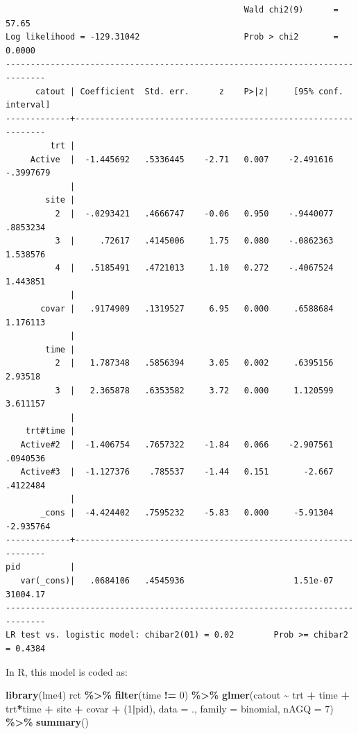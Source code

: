 \documentclass[
]{book}
\newenvironment{Shaded}{\begin{snugshade}}{\end{snugshade}}
\newcommand{\AttributeTok}[1]{\textcolor[rgb]{0.13,0.29,0.53}{#1}}
\newcommand{\DecValTok}[1]{\textcolor[rgb]{0.00,0.00,0.81}{#1}}
\newcommand{\FunctionTok}[1]{\textcolor[rgb]{0.13,0.29,0.53}{\textbf{#1}}}
\newcommand{\NormalTok}[1]{#1}
\newcommand{\SpecialCharTok}[1]{\textcolor[rgb]{0.81,0.36,0.00}{\textbf{#1}}}
\begin{document}
\begin{verbatim}
                                                Wald chi2(9)      =      57.65
Log likelihood = -129.31042                     Prob > chi2       =     0.0000
------------------------------------------------------------------------------
      catout | Coefficient  Std. err.      z    P>|z|     [95% conf. interval]
-------------+----------------------------------------------------------------
         trt |
     Active  |  -1.445692   .5336445    -2.71   0.007    -2.491616   -.3997679
             |
        site |
          2  |  -.0293421   .4666747    -0.06   0.950    -.9440077    .8853234
          3  |     .72617   .4145006     1.75   0.080    -.0862363    1.538576
          4  |   .5185491   .4721013     1.10   0.272    -.4067524    1.443851
             |
       covar |   .9174909   .1319527     6.95   0.000     .6588684    1.176113
             |
        time |
          2  |   1.787348   .5856394     3.05   0.002     .6395156     2.93518
          3  |   2.365878   .6353582     3.72   0.000     1.120599    3.611157
             |
    trt#time |
   Active#2  |  -1.406754   .7657322    -1.84   0.066    -2.907561    .0940536
   Active#3  |  -1.127376    .785537    -1.44   0.151       -2.667    .4122484
             |
       _cons |  -4.424402   .7595232    -5.83   0.000     -5.91304   -2.935764
-------------+----------------------------------------------------------------
pid          |
   var(_cons)|   .0684106   .4545936                      1.51e-07    31004.17
------------------------------------------------------------------------------
LR test vs. logistic model: chibar2(01) = 0.02        Prob >= chibar2 = 0.4384
\end{verbatim}

In R, this model is coded as:

\begin{Shaded}
\begin{Highlighting}[]
\FunctionTok{library}\NormalTok{(lme4)}
\NormalTok{rct }\SpecialCharTok{\%\textgreater{}\%}
  \FunctionTok{filter}\NormalTok{(time }\SpecialCharTok{!=} \DecValTok{0}\NormalTok{) }\SpecialCharTok{\%\textgreater{}\%}
  \FunctionTok{glmer}\NormalTok{(catout }\SpecialCharTok{\textasciitilde{}}\NormalTok{ trt }\SpecialCharTok{+}\NormalTok{ time }\SpecialCharTok{+}\NormalTok{ trt}\SpecialCharTok{*}\NormalTok{time }\SpecialCharTok{+}\NormalTok{ site }\SpecialCharTok{+}\NormalTok{ covar }\SpecialCharTok{+}\NormalTok{ (}\DecValTok{1}\SpecialCharTok{|}\NormalTok{pid), }
        \AttributeTok{data =}\NormalTok{ ., }
        \AttributeTok{family =}\NormalTok{ binomial, }
        \AttributeTok{nAGQ =} \DecValTok{7}\NormalTok{) }\SpecialCharTok{\%\textgreater{}\%} 
  \FunctionTok{summary}\NormalTok{()}
\end{Highlighting}
\end{Shaded}
\end{document}
